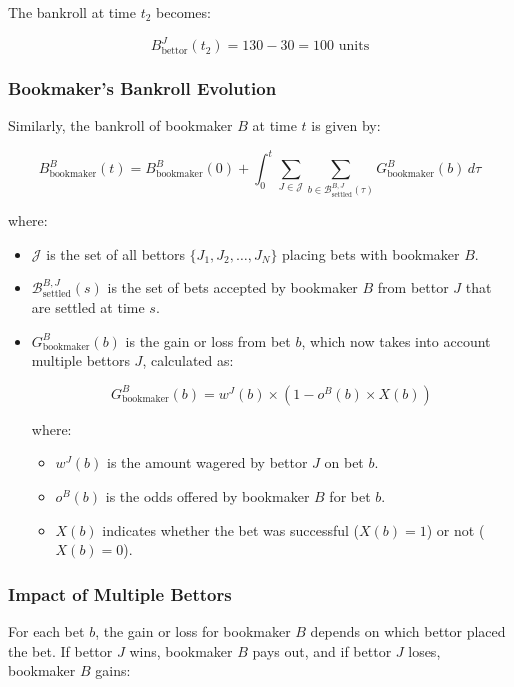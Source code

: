 The bankroll at time \( t_2 \) becomes:

\[
B_{\text{bettor}}^J(t_2) = 130 - 30 = 100 \text{ units}
\]

\subsubsection{Bookmaker's Bankroll Evolution}

Similarly, the bankroll of bookmaker \( B \) at time \( t \) is given by:

\[
B_{\text{bookmaker}}^B(t) = B_{\text{bookmaker}}^B(0) + \int_0^t \sum_{J \in \mathcal{J}} \sum_{b \in \mathcal{B}_{\text{settled}}^{B,J}(\tau)} G_{\text{bookmaker}}^B(b) \, d\tau
\]

where:

\begin{itemize}

    \item \( \mathcal{J} \) is the set of all bettors \( \{ J_1, J_2, \dots, J_N \} \) placing bets with bookmaker \( B \).
    \item \( \mathcal{B}_{\text{settled}}^{B,J}(s) \) is the set of bets accepted by bookmaker \( B \) from bettor \( J \) that are settled at time \( s \).
    \item \( G_{\text{bookmaker}}^B(b) \) is the gain or loss from bet \( b \), which now takes into account multiple bettors \( J \), calculated as:
    
    \[
    G_{\text{bookmaker}}^B(b) = w^{J}(b) \times \left( 1 - o^{B}(b) \times X(b) \right)
    \]
    
    where:
    \begin{itemize}
        \item \( w^{J}(b) \) is the amount wagered by bettor \( J \) on bet \( b \).
        \item \( o^{B}(b) \) is the odds offered by bookmaker \( B \) for bet \( b \).
        \item \( X(b) \) indicates whether the bet was successful (\( X(b) = 1 \)) or not (\( X(b) = 0 \)).
    \end{itemize}
\end{itemize}
\subsubsection{Impact of Multiple Bettors}

For each bet \( b \), the gain or loss for bookmaker \( B \) depends on which bettor placed the bet. If bettor \( J \) wins, bookmaker \( B \) pays out, and if bettor \( J \) loses, bookmaker \( B \) gains:


